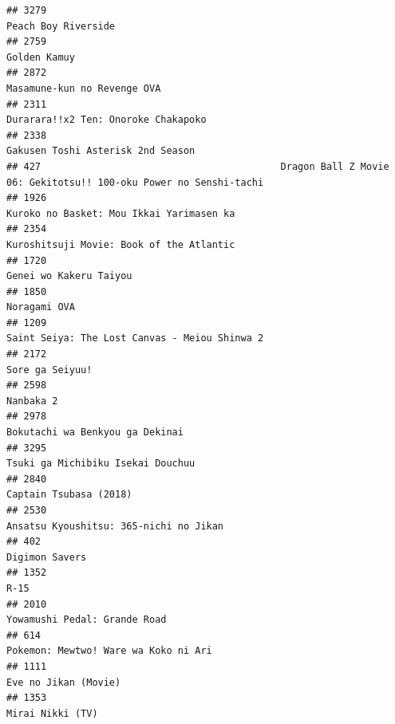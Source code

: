 \documentclass[
]{article}
\begin{document}
\begin{verbatim}
## 3279                                                                                       Peach Boy Riverside
## 2759                                                                                              Golden Kamuy
## 2872                                                                               Masamune-kun no Revenge OVA
## 2311                                                                       Durarara!!x2 Ten: Onoroke Chakapoko
## 2338                                                                         Gakusen Toshi Asterisk 2nd Season
## 427                                          Dragon Ball Z Movie 06: Gekitotsu!! 100-oku Power no Senshi-tachi
## 1926                                                                  Kuroko no Basket: Mou Ikkai Yarimasen ka
## 2354                                                                  Kuroshitsuji Movie: Book of the Atlantic
## 1720                                                                                    Genei wo Kakeru Taiyou
## 1850                                                                                              Noragami OVA
## 1209                                                             Saint Seiya: The Lost Canvas - Meiou Shinwa 2
## 2172                                                                                           Sore ga Seiyuu!
## 2598                                                                                                 Nanbaka 2
## 2978                                                                           Bokutachi wa Benkyou ga Dekinai
## 3295                                                                         Tsuki ga Michibiku Isekai Douchuu
## 2840                                                                                    Captain Tsubasa (2018)
## 2530                                                                    Ansatsu Kyoushitsu: 365-nichi no Jikan
## 402                                                                                             Digimon Savers
## 1352                                                                                                      R-15
## 2010                                                                              Yowamushi Pedal: Grande Road
## 614                                                                       Pokemon: Mewtwo! Ware wa Koko ni Ari
## 1111                                                                                      Eve no Jikan (Movie)
## 1353                                                                                          Mirai Nikki (TV)

\end{verbatim}
\end{document}
